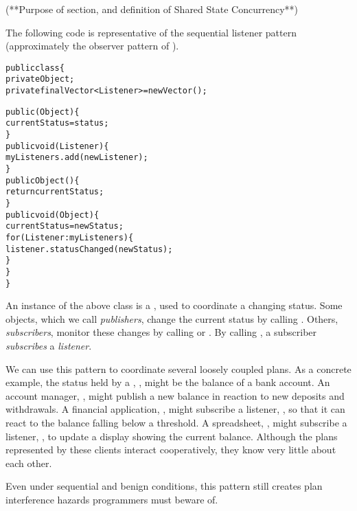 \documentclass{llncs}
\begin{document}
(**Purpose of section, and definition of Shared State Concurrency**)

The following code is representative of the sequential listener
pattern \cite{Englander:beans} (approximately the observer pattern of
\cite{gamma:patterns}).
%
\begin{alltt}
    public class  \{
        private Object ;
        private final Vector<Listener>  = new Vector();

        public (Object ) \{
            currentStatus = status;
        \}
        public void (Listener ) \{
            myListeners.add(newListener);
        \}
        public Object () \{
            return currentStatus; 
        \}
        public void (Object ) \{
            currentStatus = newStatus;
            for (Listener : myListeners) \{
                listener.statusChanged(newStatus);
            \}
        \}
    \}
\end{alltt}
%
An instance of the above class is a , used to
coordinate a changing status. Some objects, which we call
\emph{publishers}, change the current status by calling
. Others, \emph{subscribers}, monitor these changes by
calling  or . By calling
, a subscriber \emph{subscribes} a \emph{listener}.

We can use this pattern to coordinate several loosely coupled
plans. As a concrete example, the status held by a
, , might be the balance of a bank
account. An account manager, , might publish a new balance in
reaction to new deposits and withdrawals. A financial application,
, might subscribe a listener, , so that it can react
to the balance falling below a threshold. A spreadsheet, ,
might subscribe a listener, , to update a display showing the
current balance. Although the plans represented by these clients
interact cooperatively, they know very little about each other.

Even under sequential and benign conditions, this pattern still
creates plan interference hazards programmers must beware of.
\end{document}
